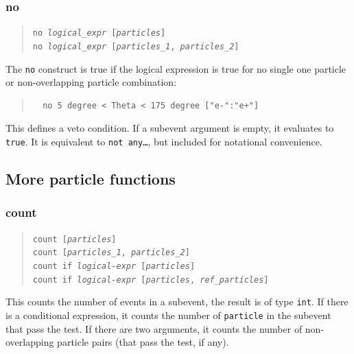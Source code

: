\documentclass[12pt]{book}
\newcommand{\ttt}[1]{\texttt{#1}}
\begin{document}
\subsubsection{no}
\begin{quote}
\begin{footnotesize}
  \ttt{no \textit{logical\_expr} [\textit{particles}]} \\
  \ttt{no \textit{logical\_expr} [\textit{particles\_1}, \textit{particles\_2}]}
\end{footnotesize}
\end{quote}
The \ttt{no} construct is true if the logical expression is true for no single
one particle or non-overlapping particle combination:
\begin{quote}
\begin{footnotesize}
\begin{verbatim}
  no 5 degree < Theta < 175 degree ["e-":"e+"]
\end{verbatim}
\end{footnotesize}
\end{quote}
This defines a veto condition.  If a subevent argument is empty, it
evaluates to \ttt{true}.  It is equivalent to \ttt{not any\ldots}, but
included for notational convenience.


\subsection{More particle functions}

\subsubsection{count}
\begin{quote}
\begin{footnotesize}
  \ttt{count [\textit{particles}]} \\
  \ttt{count [\textit{particles\_1}, \textit{particles\_2}]} \\
  \ttt{count if \textit{logical-expr} [\textit{particles}]} \\
  \ttt{count if \textit{logical-expr} [\textit{particles}, \textit{ref\_particles}]}
\end{footnotesize}
\end{quote}
This counts the number of events in a subevent, the result is of type
\ttt{int}.  If there is a conditional expression, it counts the number of
\ttt{particle} in the subevent that pass the test.   If there are two
arguments, it counts the number of non-overlapping particle pairs (that pass
the test, if any).
\end{document}
